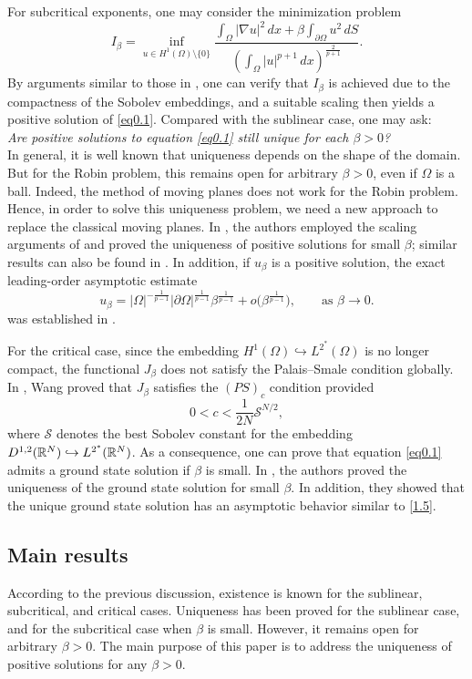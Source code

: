 \documentclass[12pt,reqno]{amsart}
\numberwithin{equation}{section}
\theoremstyle{definition}
\def\R{{\mathfrak R}}
\def\R{\Bbb R}
\begin{document}
For subcritical exponents, one may consider the minimization problem 
\begin{equation}\label{1.4}
I_\beta=\inf_{u\in H^1(\Omega)\setminus\{0\}}
\frac{\int_{\Omega}|\nabla u|^2\,dx+\beta\int_{\partial\Omega}u^2\,dS}
{\left(\int_{\Omega}|u|^{p+1}\,dx\right)^{\frac{2}{p+1}}}.
\end{equation}
By arguments similar to those in \cite{Z}, one can verify that $I_\beta$ is achieved due to the compactness of the Sobolev embeddings, and a suitable scaling then yields a positive solution of \eqref{eq0.1}. 
Compared with the sublinear case, one may ask:\\
{\em Are positive solutions to equation \eqref{eq0.1} still unique for each $\beta>0$?}\\ 
In general, it is well known that uniqueness depends on the shape of the domain. But for the Robin problem, this remains open for arbitrary $\beta>0$, even if $\Omega$ is a ball. Indeed, the method of moving planes does not work for the Robin problem. Hence, in order to solve this uniqueness problem, we need a new approach to replace the classical moving planes.
In \cite{CGL}, the authors employed the scaling arguments of \cite{GS1} and proved the uniqueness of positive solutions for small $\beta$; similar results can also be found in \cite{DF,FD}. In addition, if $u_\beta$ is a positive solution, the exact leading-order asymptotic estimate 
\begin{equation}\label{1.5}
u_\beta=
|\Omega|^{-\frac{1}{p-1}}|\partial\Omega|^{\frac{1}{p-1}}
\beta^{\frac{1}{p-1}}
+o\bigl(\beta^{\frac{1}{p-1}}\bigr),
\qquad \text{as }\beta\to0.
\end{equation}
was established in \cite{CGL}.  

For the critical case, since the embedding $H^1(\Omega)\hookrightarrow L^{2^*}(\Omega)$ is no longer compact, the functional $J_\beta$ does not satisfy the Palais--Smale condition globally. In \cite{W}, Wang proved that $J_\beta$ satisfies the $(PS)_c$ condition provided
\[
0<c<\frac{1}{2N}\mathcal{S}^{N/2},
\]
where $\mathcal{S}$ denotes the best Sobolev constant for the embedding $D^{1,2}(\R^N)\hookrightarrow L^{2^*}(\R^N)$. As a consequence, one can prove that equation \eqref{eq0.1} admits a ground state solution if $\beta$ is small. In \cite{CGL}, the authors proved the uniqueness of the ground state solution for small $\beta$. In addition, they showed that the unique ground state solution has an asymptotic behavior similar to \eqref{1.5}.


\subsection{Main results}
According to the previous discussion, existence is known for the sublinear, subcritical, and critical cases. Uniqueness has been proved for the sublinear case, and for the subcritical case when $\beta$ is small. However, it remains open for arbitrary $\beta>0$.
The main purpose of this paper is to address the uniqueness of positive solutions for any $\beta>0$.
\end{document}
